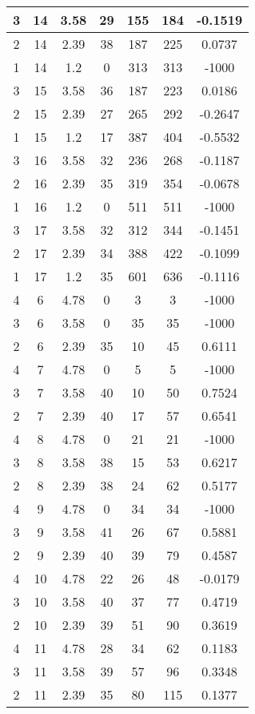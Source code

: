 \documentclass[letterpaper, 12pt]{article}
\begin{document}
\begin{longtable}{|c|c|c|c|c|c|c|}
\hline
3 & 14 & 3.58 & 29 & 155 & 184 & -0.1519 \\
\hline
2 & 14 & 2.39 & 38 & 187 & 225 & 0.0737 \\
\hline
1 & 14 & 1.2 & 0 & 313 & 313 & -1000 \\
\hline
3 & 15 & 3.58 & 36 & 187 & 223 & 0.0186 \\
\hline
2 & 15 & 2.39 & 27 & 265 & 292 & -0.2647 \\
\hline
1 & 15 & 1.2 & 17 & 387 & 404 & -0.5532 \\
\hline
3 & 16 & 3.58 & 32 & 236 & 268 & -0.1187 \\
\hline
2 & 16 & 2.39 & 35 & 319 & 354 & -0.0678 \\
\hline
1 & 16 & 1.2 & 0 & 511 & 511 & -1000 \\
\hline
3 & 17 & 3.58 & 32 & 312 & 344 & -0.1451 \\
\hline
2 & 17 & 2.39 & 34 & 388 & 422 & -0.1099 \\
\hline
1 & 17 & 1.2 & 35 & 601 & 636 & -0.1116 \\
\hline
4 & 6 & 4.78 & 0 & 3 & 3 & -1000 \\
\hline
3 & 6 & 3.58 & 0 & 35 & 35 & -1000 \\
\hline
2 & 6 & 2.39 & 35 & 10 & 45 & 0.6111 \\
\hline
4 & 7 & 4.78 & 0 & 5 & 5 & -1000 \\
\hline
3 & 7 & 3.58 & 40 & 10 & 50 & 0.7524 \\
\hline
2 & 7 & 2.39 & 40 & 17 & 57 & 0.6541 \\
\hline
4 & 8 & 4.78 & 0 & 21 & 21 & -1000 \\
\hline
3 & 8 & 3.58 & 38 & 15 & 53 & 0.6217 \\
\hline
2 & 8 & 2.39 & 38 & 24 & 62 & 0.5177 \\
\hline
4 & 9 & 4.78 & 0 & 34 & 34 & -1000 \\
\hline
3 & 9 & 3.58 & 41 & 26 & 67 & 0.5881 \\
\hline
2 & 9 & 2.39 & 40 & 39 & 79 & 0.4587 \\
\hline
4 & 10 & 4.78 & 22 & 26 & 48 & -0.0179 \\
\hline
3 & 10 & 3.58 & 40 & 37 & 77 & 0.4719 \\
\hline
2 & 10 & 2.39 & 39 & 51 & 90 & 0.3619 \\
\hline
4 & 11 & 4.78 & 28 & 34 & 62 & 0.1183 \\
\hline
3 & 11 & 3.58 & 39 & 57 & 96 & 0.3348 \\
\hline
2 & 11 & 2.39 & 35 & 80 & 115 & 0.1377 \\

\end{longtable}
\end{document}
